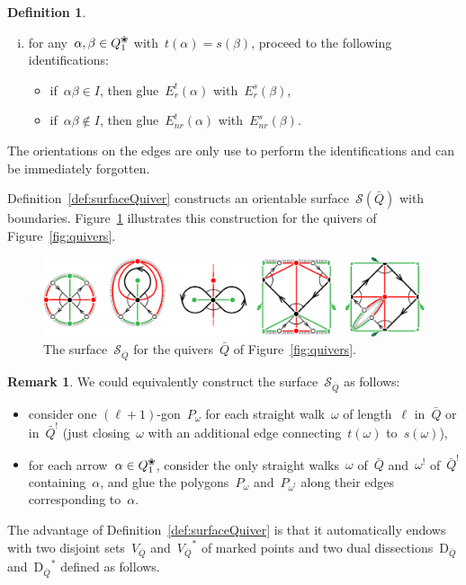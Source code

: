 \documentclass{amsart}
\theoremstyle{definition}
\newtheorem{definition}[theorem]{Definition}
\newtheorem{remark}[theorem]{Remark}
\newcommand{\fref}[1]{Figure~\ref{#1}} %
\newcommand{\blossom}{^\text{\ding{96}}} %
\newcommand{\Enrs}[1]{E_{nr}^{s}(#1)}
\newcommand{\Ers}[1]{E_{r}^{s}(#1)}
\newcommand{\Enrt}[1]{E_{nr}^{t}(#1)}
\newcommand{\Ert}[1]{E_{r}^{t}(#1)}
\newcommand{\surface}{\mathcal{S}} %
\newcommand{\dual}{^*} %
\newcommand{\dissection}{\mathrm{D}} %
\newcommand{\koszul}{^!} %
\begin{document}
\begin{definition}
\begin{enumerate}[(i)]
\item for any~$\alpha, \beta \in Q_1\blossom$ with~$t(\alpha) = s(\beta)$, proceed to the following identifications:
    \begin{itemize}
    \item if~$\alpha\beta \in I$, then glue~$\Ert{\alpha}$ with~$\Ers{\beta}$,
    \item if~$\alpha\beta \notin I$, then glue~$\Enrt{\alpha}$ with~$\Enrs{\beta}$.
    \end{itemize}
\end{enumerate}
The orientations on the edges are only use to perform the identifications and can be immediately forgotten.
\end{definition}

Definition~\ref{def:surfaceQuiver} constructs an orientable surface~$\surface(\bar Q)$ with boundaries.
\fref{fig:surfaces} illustrates this construction for the quivers of \fref{fig:quivers}.

\begin{figure}[t]
	\capstart
	\centerline{\includegraphics[scale=.7]{surfaces}}
	\caption{The surface~$\surface_{\bar Q}$ for the quivers~$\bar Q$ of \fref{fig:quivers}.}
	\label{fig:surfaces}
\end{figure}

\begin{remark}
We could equivalently construct the surface~$\surface_{\bar Q}$ as follows:
\begin{itemize}
\item consider one $(\ell+1)$-gon~$P_\omega$ for each straight walk~$\omega$ of length~$\ell$ in~$\bar Q$ or in~$\bar Q\koszul$ (just closing~$\omega$ with an additional edge connecting~$t(\omega)$ to~$s(\omega)$),
\item for each arrow~$\alpha \in Q_1\blossom$, consider the only straight walks~$\omega$ of~$\bar Q$ and~$\omega\koszul$ of~$\bar Q\koszul$ containing~$\alpha$, and glue the polygons~$P_\omega$ and~$P_{\omega\koszul}$ along their edges corresponding to~$\alpha$.
\end{itemize}
\end{remark}


The advantage of Definition~\ref{def:surfaceQuiver} is that it automatically endows with two disjoint sets~$V_{\bar Q}$ and~${V_{\bar Q}}\dual$ of marked points and two dual dissections~$\dissection_{\bar Q}$ and~${\dissection_{\bar Q}}\dual$ defined as follows.
\end{document}
